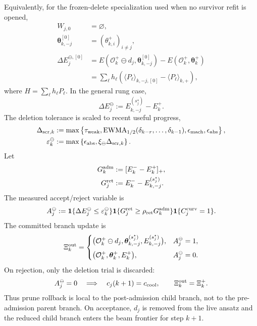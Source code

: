 \documentclass[
  reprint,
  amsmath,
  amssymb,
  aps,
  pra,
  nofootinbib,
  superscriptaddress,
  floatfix
]{revtex4-2}
\begin{document}
Equivalently, for the frozen-delete specialization used when no survivor refit is opened,
\[
\begin{aligned}
W_{j,0}&=\varnothing,
\\
\boldsymbol\theta_{k,-j}^{[0]}
&=(\theta_{k,i}^+)_{i\ne j},
\\
\Delta E_j^{\ominus,[0]}
&=
E(\mathcal O_k^+\ominus d_j,\boldsymbol\theta_{k,-j}^{[0]})
-
E(\mathcal O_k^+,\boldsymbol\theta_k^+)
\\
&=
\sum_\ell h_\ell
\left(
\langle P_\ell\rangle_{k,-j,[0]}
-
\langle P_\ell\rangle_{k,+}
\right),
\end{aligned}
\]
where \(H=\sum_\ell h_\ell P_\ell\).  In the general rung case,
\[
\Delta E_j^{\ominus}
:=
E_{k,-j}^{(s_j^\star)}-E_k^+ .
\]
The deletion tolerance is scaled to recent useful progress,
\[
\begin{aligned}
\Delta_{{\rm scr},k}
&:=
\max\left\{
\tau_{\rm weak},
\operatorname{EWMA}_{1/2}(\delta_{k-r},\ldots,\delta_{k-1}),
\epsilon_{\rm mach},
\epsilon_{\rm abs}
\right\},
\\
\varepsilon_k^\ominus
&:=
\max\left\{
\epsilon_{\rm abs},
\xi_\ominus\Delta_{{\rm scr},k}
\right\}.
\end{aligned}
\]
Let
\[
\begin{aligned}
G_k^{\rm adm}
&:=[E_k^- - E_k^+]_+,
\\
G_j^{\rm ret}
&:=E_k^- - E_{k,-j}^{(s_j^\star)} .
\end{aligned}
\]
The measured accept/reject variable is
\[
A_j^\ominus
:=
\mathbf 1\{\Delta E_j^\ominus\le \varepsilon_k^\ominus\}
\mathbf 1\{G_j^{\rm ret}\ge \rho_{\rm ret}G_k^{\rm adm}\}
\mathbf 1\{C_j^{\rm curv}=1\}.
\]
The committed branch update is
\[
\Xi_k^{\rm out}
=
\begin{cases}
\bigl(
\mathcal O_k^+\ominus d_j,
\boldsymbol\theta_{k,-j}^{(s_j^\star)},
E_{k,-j}^{(s_j^\star)}
\bigr),
& A_j^\ominus=1,
\\[2mm]
\bigl(
\mathcal O_k^+,
\boldsymbol\theta_k^+,
E_k^+
\bigr),
& A_j^\ominus=0 .
\end{cases}
\]
On rejection, only the deletion trial is discarded:
\[
A_j^\ominus=0
\quad\Longrightarrow\quad
c_j(k+1)=c_{\rm cool},
\qquad
\Xi_k^{\rm out}=\Xi_k^+ .
\]
Thus prune rollback is local to the post-admission child branch, not to the pre-admission parent branch.  On acceptance, \(d_j\) is removed from the live ansatz and the reduced child branch enters the beam frontier for step \(k+1\).
\end{document}
